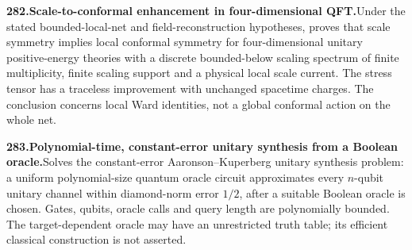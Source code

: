 \documentclass[11pt,a4paper]{article}
\begin{document}
  \par \begin{minipage}{\linewidth}
  \fontsize{10.5}{12.6}\selectfont\RaggedRight
  \hypertarget{result 282}{}
  {\bfseries\textcolor{muted}{282.}\enspace Scale-to-conformal enhancement in four-dimensional QFT.}\enspace Under the stated bounded-local-net and field-reconstruction hypotheses, proves that scale symmetry implies local conformal symmetry for four-dimensional unitary positive-energy theories with a discrete bounded-below scaling spectrum of finite multiplicity, finite scaling support and a physical local scale current. The stress tensor has a traceless improvement with unchanged spacetime charges. The conclusion concerns local Ward identities, not a global conformal action on the whole net.\par
  \end{minipage}\par\vspace{5pt}



  \par \begin{minipage}{\linewidth}
  \fontsize{10.5}{12.6}\selectfont\RaggedRight
  \hypertarget{result 283}{}
  {\bfseries\textcolor{muted}{283.}\enspace Polynomial-time, constant-error unitary synthesis from a Boolean oracle.}\enspace Solves the constant-error Aaronson--Kuperberg unitary synthesis problem: a uniform polynomial-size quantum oracle circuit approximates every $n$-qubit unitary channel within diamond-norm error $1/2$, after a suitable Boolean oracle is chosen. Gates, qubits, oracle calls and query length are polynomially bounded. The target-dependent oracle may have an unrestricted truth table; its efficient classical construction is not asserted.\par
  \end{minipage}\par\vspace{5pt}
\end{document}
